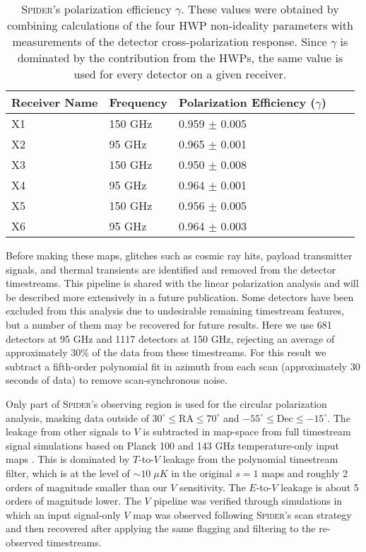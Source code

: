 \documentclass[twocolumn]{aastex61}
\begin{document}
\begin{table}[ht]
\begin{center}
    \begin{tabular}{ *5l } 
    \toprule
    Receiver Name & Frequency & Polarization Efficiency ($\gamma$) \\ \midrule
    X1 & 150 GHz  &	0.959 $\pm$ 0.005 \\ 
    X2 & 95 GHz  &	0.965 $\pm$ 0.001 \\ 
    X3 & 150 GHz  &	0.950 $\pm$ 0.008 \\
    X4 & 95 GHz  &	0.964 $\pm$ 0.001 \\
    X5 & 150 GHz  &	0.956 $\pm$ 0.005 \\
    X6 & 95 GHz  &	0.964 $\pm$ 0.003 \\
    \bottomrule
    \end{tabular}
    \caption{\textsc{Spider}'s polarization efficiency $\gamma$. These values were obtained by combining calculations of the four HWP non-ideality parameters with measurements of the detector cross-polarization response. Since $\gamma$ is dominated by the contribution from the HWPs, the same value is used for every detector on a given receiver.}
    \label{table: gamma}
\end{center}
\end{table}

Before making these maps, glitches such as cosmic ray hits, payload transmitter signals, and thermal transients are identified and removed from the detector timestreams.  This pipeline is shared with the linear polarization analysis and will be described more extensively in a future publication. Some detectors have been excluded from this analysis due to undesirable remaining timestream features, but a number of them may be recovered for future results.  Here we use 681 detectors at 95 GHz and 1117 detectors at 150 GHz, rejecting an average of approximately 30\% of the data from these timestreams.  For this result we subtract a fifth-order polynomial fit in azimuth from each scan (approximately 30 seconds of data) to remove scan-synchronous noise.

Only part of \textsc{Spider}'s observing region is used for the circular polarization analysis, masking data outside of $30^{\circ} \leq \mathrm{RA} \leq 70^{\circ}$ and $-55^{\circ} \leq \mathrm{Dec} \leq -15^{\circ}$.  The leakage from other signals to $V$ is subtracted in map-space from full timestream signal simulations based on Planck 100 and 143 GHz temperature-only input maps \citep{Planck_ref}.  This is dominated by $T$-to-$V$ leakage from the polynomial timestream filter, which is at the level of $\sim 10 \; \mu K$ in the original $s=1$ maps and roughly 2 orders of magnitude smaller than our $V$ sensitivity.  The $E$-to-$V$ leakage is about 5 orders of magnitude lower.  The $V$ pipeline was verified through simulations in which an input signal-only $V$ map was observed following \textsc{Spider}'s scan strategy and then recovered after applying the same flagging and filtering to the re-observed timestreams.
\end{document}
